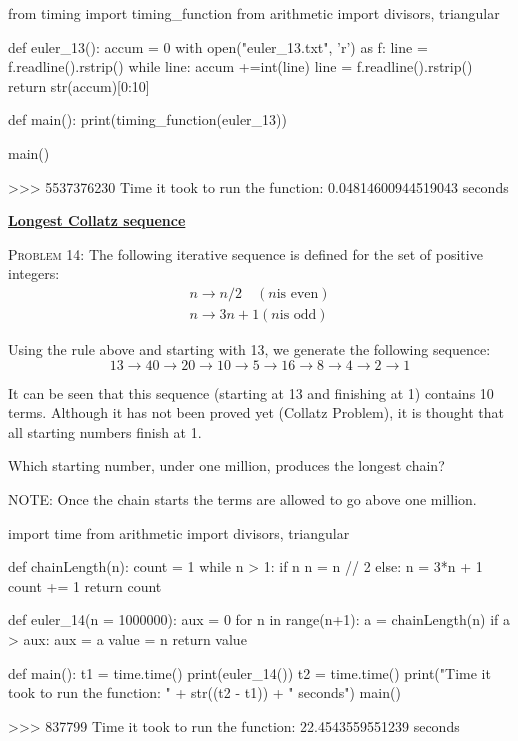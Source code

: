 \documentclass[11pt]{article}
\begin{document}
\begin{code}
from timing import timing_function
from arithmetic import divisors, triangular

def euler_13():
    accum = 0 
    with open("euler_13.txt", 'r') as f:
        line = f.readline().rstrip()
        while line:
            accum +=int(line)
            line = f.readline().rstrip()
        return str(accum)[0:10]

def main():
    print(timing_function(euler_13))

main()

\end{code}
\begin{shell}
>>> 
5537376230
Time it took to run the function: 0.04814600944519043 seconds
\end{shell}

\par\bigskip\noindent
\href{https://projecteuler.net/problem=14}{\textbf{Longest Collatz sequence}}\par\noindent
\textsc{Problem 14:}
The following iterative sequence is defined for the set of positive integers:
\begin{align*}
n \to n/2 \quad (n \text{is even})\\
n \to 3n + 1 (n \text{is odd})
\end{align*}

Using the rule above and starting with 13, we generate the following sequence:
\begin{equation*}
13 \to 40 \to 20 \to 10 \to 5 \to 16 \to 8 \to 4 \to 2 \to 1  
\end{equation*}

It can be seen that this sequence (starting at 13 and finishing at 1) contains 10 terms. Although it has not been proved yet (Collatz Problem), it is thought that all starting numbers finish at 1.
\par
Which starting number, under one million, produces the longest chain?
\par
NOTE: Once the chain starts the terms are allowed to go above one million.

\begin{code}
import time
from arithmetic import divisors, triangular

def chainLength(n):
    count  = 1
    while n > 1:
        if n %
            n = n // 2
        else:
            n = 3*n + 1
        count += 1
    return count
        
def euler_14(n = 1000000):
    aux = 0 
    for n in range(n+1):
        a = chainLength(n)
        if a > aux:
            aux = a
            value = n
    return value

def main():
        t1 = time.time()
        print(euler_14())
        t2 = time.time()
        print("Time it took to run the function: " + str((t2 - t1)) + " seconds")
main()
\end{code}
\begin{shell}
>>>
837799
Time it took to run the function: 22.4543559551239 seconds
\end{shell}
\end{document}
